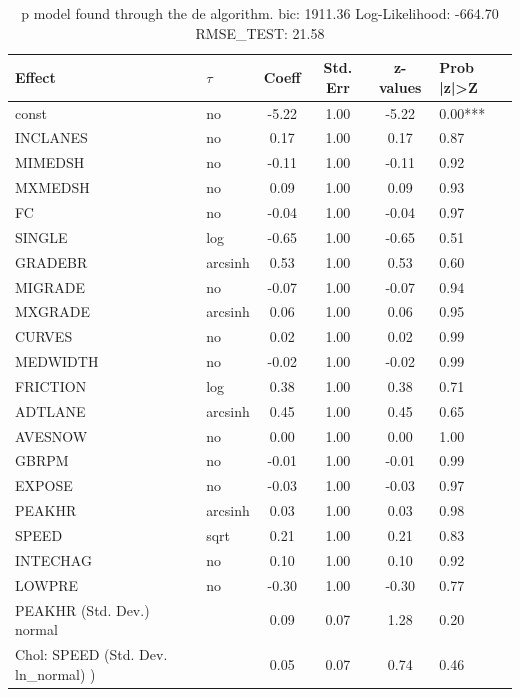 \begin{table}
	\caption{p model found through the de algorithm. bic: 1911.36 Log-Likelihood: -664.70 RMSE_TEST: 21.58}
	\begin{center}
		\begin{tabular}{|l|l|c|c|c|l|}
			\hline
			Effect & $\tau$ & Coeff & Std. Err & z-values & Prob |z|>Z \\
			\hline
			const & no & -5.22 & 1.00 & -5.22 & 0.00*** \\
			\hline
			INCLANES & no & 0.17 & 1.00 & 0.17 & 0.87 \\
			\hline
			MIMEDSH & no & -0.11 & 1.00 & -0.11 & 0.92 \\
			\hline
			MXMEDSH & no & 0.09 & 1.00 & 0.09 & 0.93 \\
			\hline
			FC & no & -0.04 & 1.00 & -0.04 & 0.97 \\
			\hline
			SINGLE & log & -0.65 & 1.00 & -0.65 & 0.51 \\
			\hline
			GRADEBR & arcsinh & 0.53 & 1.00 & 0.53 & 0.60 \\
			\hline
			MIGRADE & no & -0.07 & 1.00 & -0.07 & 0.94 \\
			\hline
			MXGRADE & arcsinh & 0.06 & 1.00 & 0.06 & 0.95 \\
			\hline
			CURVES & no & 0.02 & 1.00 & 0.02 & 0.99 \\
			\hline
			MEDWIDTH & no & -0.02 & 1.00 & -0.02 & 0.99 \\
			\hline
			FRICTION & log & 0.38 & 1.00 & 0.38 & 0.71 \\
			\hline
			ADTLANE & arcsinh & 0.45 & 1.00 & 0.45 & 0.65 \\
			\hline
			AVESNOW & no & 0.00 & 1.00 & 0.00 & 1.00 \\
			\hline
			GBRPM & no & -0.01 & 1.00 & -0.01 & 0.99 \\
			\hline
			EXPOSE & no & -0.03 & 1.00 & -0.03 & 0.97 \\
			\hline
			PEAKHR & arcsinh & 0.03 & 1.00 & 0.03 & 0.98 \\
			\hline
			SPEED & sqrt & 0.21 & 1.00 & 0.21 & 0.83 \\
			\hline
			INTECHAG & no & 0.10 & 1.00 & 0.10 & 0.92 \\
			\hline
			LOWPRE & no & -0.30 & 1.00 & -0.30 & 0.77 \\
			\hline
			PEAKHR (Std. Dev.) normal &  & 0.09 & 0.07 & 1.28 & 0.20 \\
			\hline
			 Chol: SPEED (Std. Dev. ln_normal) ) &  & 0.05 & 0.07 & 0.74 & 0.46 \\

\end{tabular}
\end{center}
\end{table}
